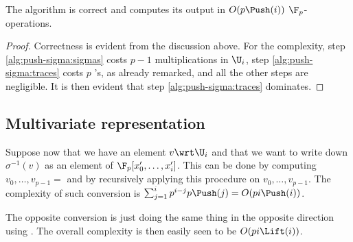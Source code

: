 \begin{theorem}
  The algorithm  is correct and computes its
  output in $O(p\Push(i))$ $\F_p$-operations.
\end{theorem}
\begin{proof}
  Correctness is evident from the discussion above. For the
  complexity, step \ref{alg:push-sigma:sigmas} costs $p-1$
  multiplications in $\U_i$, step \ref{alg:push-sigma:traces} costs
  $p$ 's, as already remarked, and all the other steps
  are negligible. It is then evident that step
  \ref{alg:push-sigma:traces} dominates.
\end{proof}


\subsection{Multivariate representation}
Suppose now that we have an element $v\wrt\U_i$ and that we want to
write down $\sigma^{-1}(v)$ as an element of
$\F_p[x_0',\ldots,x_i']$. This can be done by computing
$v_0,\ldots,v_{p-1}=$  and by recursively
applying this procedure on $v_0,\ldots,v_{p-1}$. The complexity of
such conversion is $\sum_{j=1}^ip^{i-j}p\Push(j) = O(pi\Push(i))$.

The opposite conversion is just doing the same thing in the opposite
direction using . The overall complexity is then
easily seen to be $O(pi\Lift(i))$.



%
